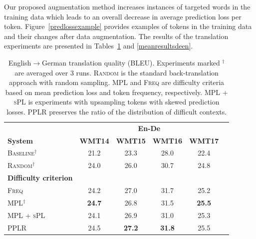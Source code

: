 Our proposed augmentation method increases instances of targeted words in the training data which leads to an overall decrease in average prediction loss per token. Figure~\ref{predlossexample} provides examples of tokens in the training data and their changes after data augmentation.  
The results of the translation experiments are presented in Tables~\ref{meanresultsende} and \ref{meanresultsdeen}.

\begin{table}
\begin{center}
\tabcolsep=2.5pt%
\caption{\label{meanresultsende}  English$\rightarrow$German translation quality ({BLEU}). Experiments marked $^\dagger$ are averaged over 3 runs. \textsc{Random} is the standard back-translation approach with random sampling. \textsc{MPL} and \textsc{Freq} are difficulty criteria based on mean prediction loss and token frequency, respectively. \textsc{MPL + sPL} is experiments with upsampling tokens with skewed prediction losses. \textsc{PPLR} preserves the  ratio of the distribution of difficult contexts.	}
\begin{tabular}{@{ }lccccc@{}}
\toprule
   & \multicolumn{4}{c}{\textbf{En-De}}  \\ \cmidrule{2-6} 
 \textbf{System}    &  \bf WMT14 &  \bf WMT15 &  \bf WMT16 &  \bf WMT17 \\ 
\midrule     
 \textsc{Baseline}$^\dagger$		& 21.2	&23.3&	28.0&	22.4\\
\textsc{Random}$^\dagger$  &	 24.0&	26.0&	30.7	&24.8\\ \midrule
 \textbf{Difficulty criterion} & &&      \\ \midrule
\textsc{Freq} 	&24.2&27.0&31.7 &25.2\\			
\textsc{MPL}$^\dagger$	 &\textbf{24.7}&26.8&31.5&\textbf{25.5}\\ %
\textsc{MPL + sPL} 	&24.1&26.9  &31.0&25.3\\
\textsc{PPLR}  &24.5&\textbf{27.2}&\textbf{31.8} &25.5\\
\bottomrule
\end{tabular}
\end{center}
\end{table}

